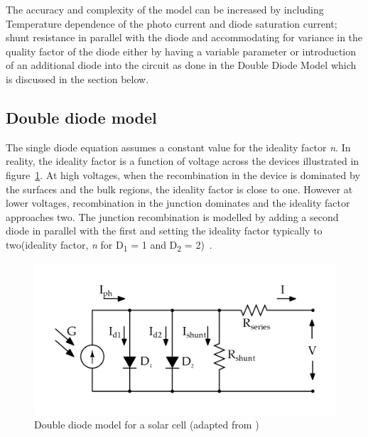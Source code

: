 The accuracy and complexity of the model can be increased by including Temperature dependence of the photo current and diode saturation current; shunt resistance in parallel with the diode and accommodating for variance in the quality factor of the diode either by having a variable parameter or introduction of an additional diode into the circuit as done in the Double Diode Model which is discussed in the section below.


\subsection{Double diode model}\label{sec:DDM}

The single diode equation assumes a constant value for the ideality factor \textit{n}. In reality, the ideality factor is a function of voltage across the devices illustrated in figure~\ref{fig:Double_EQu_cell}. At high voltages, when the recombination in the device is dominated by the surfaces and the bulk regions, the ideality factor is close to one. However at lower voltages, recombination in the junction dominates and the ideality factor approaches two. The junction recombination is modelled by adding a second diode in parallel with the first and setting the ideality factor typically to two(ideality factor, \textit{n} for D\textsubscript{1} = 1 and D\textsubscript{2} = 2)~\cite{pv_education_org}.\\

 \begin{figure}[H]
  \begin{center}
  \includegraphics[width=\textwidth]{images/Double_diode_model}
  \caption{ Double diode model for a solar cell (adapted from \cite{pv_education_org}) }
  \label{fig:Double_EQu_cell}
  \end{center}
  \end{figure}
  
